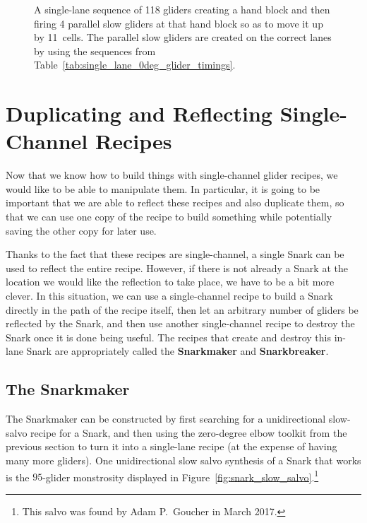 \begin{figure}[!htb]
	\caption{A single-lane sequence of 118 gliders creating a hand block and then firing 4 parallel slow gliders at that hand block so as to move it up by 11~cells. The parallel slow gliders are created on the correct lanes by using the sequences from Table~\ref{tab:single_lane_0deg_glider_timings}.}\label{fig:0_degree_block_move}
\end{figure}


\section{Duplicating and Reflecting Single-Channel Recipes}\label{sec:snarkmaker}

Now that we know how to build things with single-channel glider recipes, we would like to be able to manipulate them. In particular, it is going to be important that we are able to reflect these recipes and also duplicate them, so that we can use one copy of the recipe to build something while potentially saving the other copy for later use.

Thanks to the fact that these recipes are single-channel, a single Snark can be used to reflect the entire recipe. However, if there is not already a Snark at the location we would like the reflection to take place, we have to be a bit more clever. In this situation, we can use a single-channel recipe to build a Snark directly in the path of the recipe itself, then let an arbitrary number of gliders be reflected by the Snark, and then use another single-channel recipe to destroy the Snark once it is done being useful. The recipes that create and destroy this in-lane Snark are appropriately called the \textbf{Snarkmaker} and \textbf{Snarkbreaker}.


\subsection{The Snarkmaker}\label{sec:snarkmaker_itself}

The Snarkmaker can be constructed by first searching for a unidirectional slow-salvo recipe for a Snark, and then using the zero-degree elbow toolkit from the previous section to turn it into a single-lane recipe (at the expense of having many more gliders). One unidirectional slow salvo synthesis of a Snark that works is the $95$-glider monstrosity displayed in Figure~\ref{fig:snark_slow_salvo}.\footnote{This salvo was found by Adam P.~Goucher in March 2017.}

